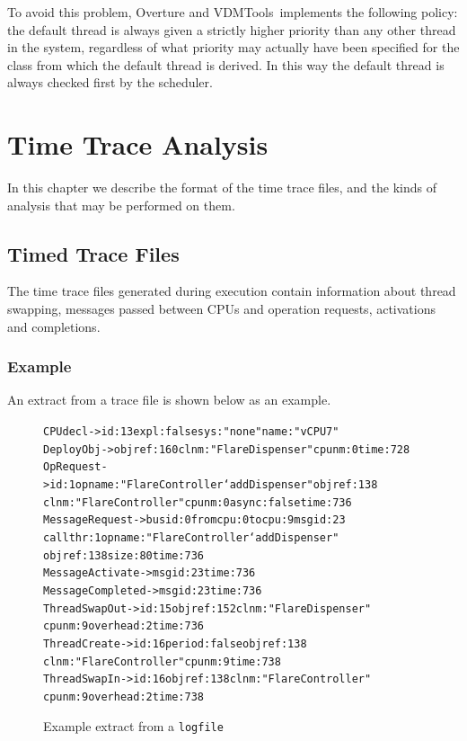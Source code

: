 \documentclass{overturerepchap}
\newcommand{\vdmtools}{VDMTools}
\begin{document}
To avoid this problem, Overture and \vdmtools\ implements the following policy:
the default thread is always given a strictly higher priority than any
other thread in the system, regardless of what priority may actually
have been specified for the class from which the default thread is
derived. In this way the default thread is always checked first by the
scheduler.

\chapter{Time Trace Analysis}\label{chap:timetrace}

In this chapter we describe the format of the time trace files, and
the kinds of analysis that may be performed on them.

\section{Timed Trace Files}

The time trace files generated during execution contain information
about thread swapping, messages passed between CPUs and operation
requests, activations and completions.

\subsection{Example}

An extract from a trace file is shown below as an example. 

\begin{figure}
{\small
\begin{alltt}
CPUdecl ->  id: 13 expl: false sys: "none" name: "vCPU 7"
DeployObj ->  objref: 160 clnm: "FlareDispenser" cpunm: 0 time: 728
OpRequest -> id: 1 opname: "FlareController`addDispenser" objref: 138 
             clnm: "FlareController" cpunm: 0 async: false time: 736
MessageRequest -> busid: 0 fromcpu: 0 tocpu: 9 msgid: 23 
                  callthr: 1 opname: "FlareController`addDispenser" 
                  objref: 138 size: 80 time: 736
MessageActivate -> msgid: 23 time: 736
MessageCompleted -> msgid: 23 time: 736
ThreadSwapOut -> id: 15 objref: 152 clnm: "FlareDispenser" 
                 cpunm: 9 overhead: 2 time: 736
ThreadCreate -> id: 16 period: false objref: 138 
                clnm: "FlareController" cpunm: 9 time: 738
ThreadSwapIn -> id: 16 objref: 138 clnm: "FlareController" 
                cpunm: 9 overhead: 2 time: 738
\end{alltt}
}
\caption{Example extract from a \texttt{logfile}}
\end{figure}
\end{document}
